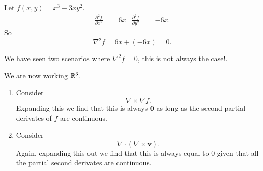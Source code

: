 \begin{example}
    Let $f(x, y) = x^3 - 3xy^2$.
    \begin{align*}
        \frac{\partial^2 f}{\partial x^2} &= 6x & \frac{\partial^2 f}{\partial y^2} &= -6x.
    \end{align*}
    So
    \[ \nabla^2f = 6x + (-6x) = 0. \]
\end{example}

We have seen two scenarios where $\nabla^2f = 0$, this is not always the case!. 

\begin{example}
    We are now working $\mathbb{R}^3$.
    \begin{enumerate}
        \item Consider
            \[ \nabla \times \nabla f. \]
            Expanding this we find that this is always $\bm 0$ as long as the second partial derivates of $f$ are continuous.

        \item Consider
            \[ \nabla \cdot (\nabla \times \bm v). \]
            Again, expanding this out we find that this is always equal to $0$ given that all the partial second derivates are continuous.
    \end{enumerate}
\end{example}

